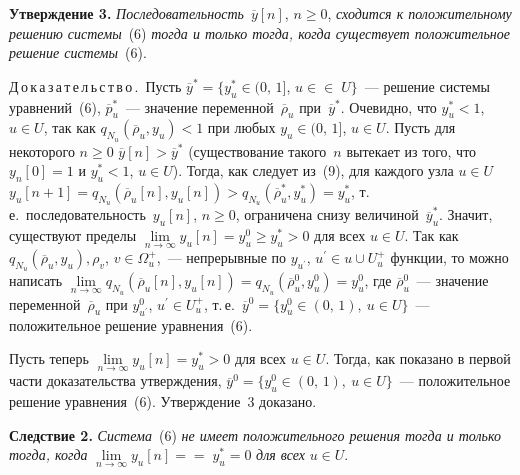 \begin{multicols}{2}
     \noindent
     \textbf{Утверждение 3.} \textit{Последовательность}~$\overline{y}[n]$, 
$n\geq 0$, \textit{сходится к положительному решению системы}~(6) 
\textit{тогда и только тогда, когда существует положительное решение 
системы}~(6).
     
     \medskip
     
     \noindent
     Д\,о\,к\,а\,з\,а\,т\,е\,л\,ь\,с\,т\,в\,о\,.\ Пусть $\overline{y}^* = \{y_u^*\in 
(0,\,1]$, $u\in$\linebreak $\in\; U\}$~--- решение системы уравнений~(6), $\overline{p}_u^*$~--- 
значение переменной~$\overline{\rho}_u$ при~$\overline{y}^*$. Очевидно, что
$y_u^*<1$, $u\in U$, так как $q_{N_u}(\overline{\rho}_u,y_u)<1$ при любых 
$y_u\in (0,\,1]$, $u\in U$. Пусть для некоторого $n\geq 0$ 
$\overline{y}[n]>\overline{y}^*$ (существование такого~$n$ вытекает из того, 
что $y_n[0] =1$ и $y_u^*<1$, $u\in U$). Тогда, как следует из~(9), для каж\-до\-го 
узла $u\in U$ $y_u[n+1]=q_{N_u} (\overline{\rho}_u[n],y_u[n]) > q_{N_u}
     (\overline{\rho}_u^*,y_u^*)=y_u^*$, т.\,е.\ последовательность~$y_u[n]$, 
$n\geq 0$, ограничена снизу величиной~$\overline{y}_u^*$. Значит, 
существуют пределы $\lim\limits_{n\rightarrow\infty} y_u[n]=y_u^0\geq 
y_u^*>0$ для всех $u\in U$. Так как $q_{N_u}(\overline{\rho}_u,y_u), \rho_v$, 
$v\in\Omega_u^+$,~--- непрерывные по $y_{u^\prime}$, $u^\prime\in u\cup 
U_u^+$ функции, то можно написать $\lim\limits_{n\rightarrow\infty} q_{N_u} 
(\overline{\rho}_u[n],y_u[n])=q_{N_u}(\overline{\rho}_u^0,y_u^0)=y_u^0$, где 
$\overline{\rho}_u^0$~--- значение переменной~$\overline{\rho}_u$ при 
$y^0_{u^\prime}$, $u^\prime\in U_u^+$, т.\,е.\ $\overline{y}^0 =\{y_u^0\in (0,\,1),\ 
u\in U\}$~--- положительное решение уравнения~(6).
     
     Пусть теперь $\lim\limits_{n\rightarrow\infty} y_u[n] =y_u^*>0$ для всех 
$u\in U$. Тогда, как показано в первой части доказательства утверждения, 
$\overline{y}^0 = \{y_u^0\in (0,\,1),\ u\in U\}$~--- положительное решение 
уравнения~(6). Утверждение~3 доказано.
     
     \medskip
     
     \noindent
     \textbf{Следствие 2.} \textit{Система}~(6) \textit{не имеет 
положительного решения тогда и только тогда, когда} 
$\lim\limits_{n\rightarrow\infty} y_u[n]=$\linebreak $=\;y_u^*=0$ \textit{для всех} $u\in U$.
     

\end{multicols}
